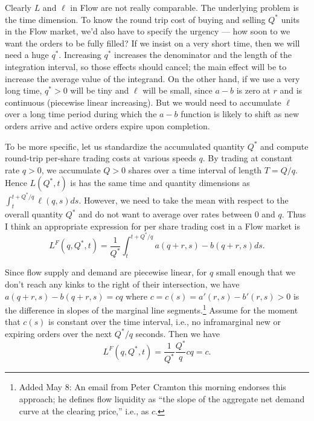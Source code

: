 \begin{singlespace}
Clearly $L$ and $\ell$ in Flow are not really comparable. The underlying problem is the time dimension. 
To know the round trip cost of buying and selling $Q^*$ units in the Flow market, we'd also have to specify the urgency --- how soon to we want the orders to be fully filled? 
If we insist on a very short time, then we will need a huge $q^*$. Increasing $q^*$ increases the denominator and the length of the integration interval, so those effects should cancel; the main effect will be to increase the average value of the integrand.  
On the other hand, if we use a very long time,
$q^*>0$ will be tiny and 
$\ell$ will be small, since $a-b$ is zero at $r$ and is continuous (piecewise linear increasing).
But we would need to accumulate $\ell$ over a long time period during which the $a-b$ function is likely to shift as new orders arrive and active orders expire upon completion.

To be more specific, let us standardize the accumulated quantity $Q^*$ and compute round-trip per-share trading costs at various speeds $q.$ 
By trading at constant rate $q>0$, we accumulate $Q>0$ shares over a time interval of length $T=Q/q$. 
Hence $L(Q^*,t)$ is has the same time and quantity dimensions as $\int_t^{t+Q^*/q}\ell(q,s)ds.$
However, we need to take the mean with respect to the overall quantity $Q^*$ and do not want to average over rates between 0 and $q.$ 
Thus I think an appropriate expression for per share trading cost in a Flow market is
\begin{equation}\label{eq:LF}
    L^F(q,Q^*,t) = \frac{1}{Q^*}\int_t^{t+Q^*/q} a(q+r,s) - b(q+r,s) ds.
\end{equation}

Since flow supply and demand are piecewise linear, for $q$ small enough that we don't reach any kinks to the right of their intersection, we have 
$a(q+r,s)-b(q+r,s) = cq$ where  $c=c(s) = a'(r,s) - b'(r,s)>0$
is the difference in slopes of the marginal line segments.\footnote{Added May 8: An email from Peter Cramton this morning endorses this approach; he defines flow liquidity as ``the slope of the aggregate net demand curve at the clearing price,'' i.e., as $c.$ }
Assume for the moment that $c(s)$ is constant over the time interval, i.e., no inframarginal new or expiring orders over the next $Q^*/q$ seconds.
Then we have
\begin{equation}\label{eq:LFA}
 L^F(q,Q^*,t)=  \frac{1}{Q^*}\frac{Q^*}{q}cq = c.  
\end{equation}


\end{singlespace}
